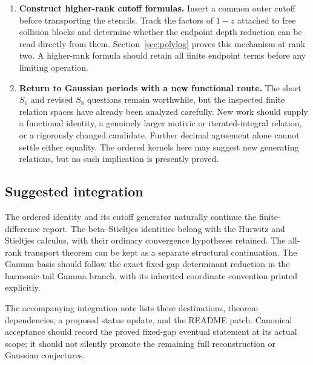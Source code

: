 \begin{enumerate}[label=\textbf{\arabic*.},leftmargin=*]
\item \textbf{Construct higher-rank cutoff formulas.}
Insert a common outer cutoff before transporting the stencils.
Track the factors of $1-z$ attached to free collision blocks and
determine whether the endpoint depth reduction can be read directly
from them. Section~\ref{sec:polylog} proves this mechanism at rank
two. A higher-rank formula should retain all finite endpoint terms
before any limiting operation.

\item \textbf{Return to Gaussian periods with a new functional route.}
The short $S_6$ and revised $S_8$ questions remain worthwhile, but
the inspected finite relation spaces have already been analyzed
carefully. New work should supply a functional identity, a genuinely
larger motivic or iterated-integral relation, or a rigorously changed
candidate. Further decimal agreement alone cannot settle either
equality. The ordered kernels here may suggest new generating
relations, but no such implication is presently proved.
\end{enumerate}

\subsection{Suggested integration}

The ordered identity and its cutoff generator naturally continue
the finite-difference report. The beta--Stieltjes identities belong
with the Hurwitz and Stieltjes calculus, with their ordinary
convergence hypotheses retained. The all-rank transport theorem
can be kept as a separate structural continuation. The Gamma basis
should follow the exact fixed-gap determinant reduction in the
harmonic-tail Gamma branch, with its inherited coordinate convention
printed explicitly.

The accompanying integration note lists these destinations, theorem
dependencies, a proposed status update, and the README patch.
Canonical acceptance should record the proved fixed-gap eventual
statement at its actual scope; it should not silently promote the
remaining full reconstruction or Gaussian conjectures.
